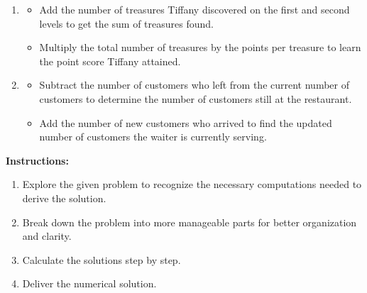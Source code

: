 \begin{tcolorbox}[breakable,colframe=mybluecolor!100, colback=mybluecolor!20, title=بهترین اعلان دستوری تولید شده برای مجموعه داده MultiArith]
\begin{LTR}
\begin{enumerate}
		\item {}
		\begin{itemize}
			\item Add the number of treasures Tiffany discovered on the first and second levels to get the sum of treasures found.
			\item Multiply the total number of treasures by the points per treasure to learn the point score Tiffany attained.
		\end{itemize}
		
		\item {}
		\begin{itemize}
			\item Subtract the number of customers who left from the current number of customers to determine the number of customers still at the restaurant.
			\item Add the number of new customers who arrived to find the updated number of customers the waiter is currently serving.
		\end{itemize}
	\end{enumerate}
	
	\textbf{Instructions:}
	\begin{enumerate}[label=\arabic*.]
		\item Explore the given problem to recognize the necessary computations needed to derive the solution.
		\item Break down the problem into more manageable parts for better organization and clarity.
		\item Calculate the solutions step by step.
		\item Deliver the numerical solution.
	\end{enumerate}
	\end{LTR}

\end{tcolorbox}
     
     
     
     
     
     
     
     
     
     
     
     